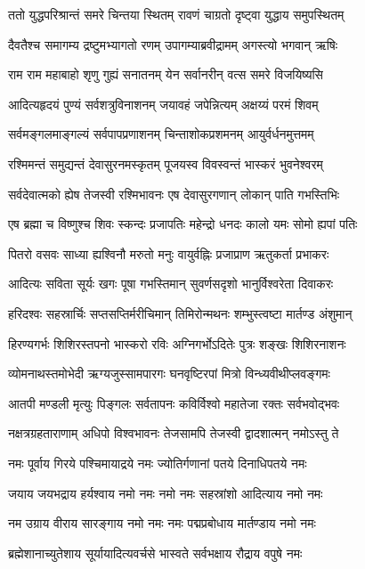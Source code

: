 
\twolineshloka
{ततो युद्धपरिश्रान्तं समरे चिन्तया स्थितम्}
{रावणं चाग्रतो दृष्ट्वा युद्धाय समुपस्थितम्}

\twolineshloka
{दैवतैश्च समागम्य द्रष्टुमभ्यागतो रणम्}
{उपागम्याब्रवीद्रामम् अगस्त्यो भगवान् ऋषिः}

\twolineshloka
{राम राम महाबाहो शृणु गुह्यं सनातनम्}
{येन सर्वानरीन् वत्स समरे विजयिष्यसि}

\twolineshloka
{आदित्यहृदयं पुण्यं सर्वशत्रुविनाशनम्}
{जयावहं जपेन्नित्यम् अक्षय्यं परमं शिवम्}

\twolineshloka
{सर्वमङ्गलमाङ्गल्यं सर्वपापप्रणाशनम्}
{चिन्ताशोकप्रशमनम् आयुर्वर्धनमुत्तमम्}

\twolineshloka
{रश्मिमन्तं समुद्यन्तं देवासुरनमस्कृतम्}
{पूजयस्व विवस्वन्तं भास्करं भुवनेश्वरम्}

\twolineshloka
{सर्वदेवात्मको ह्येष तेजस्वी रश्मिभावनः}
{एष देवासुरगणान् लोकान् पाति गभस्तिभिः}

\twolineshloka
{एष ब्रह्मा च विष्णुश्च शिवः स्कन्दः प्रजापतिः}
{महेन्द्रो धनदः कालो यमः सोमो ह्यपां पतिः}

\twolineshloka
{पितरो वसवः साध्या ह्यश्विनौ मरुतो मनुः}
{वायुर्वह्निः प्रजाप्राण ऋतुकर्ता प्रभाकरः}

\twolineshloka
{आदित्यः सविता सूर्यः खगः पूषा गभस्तिमान्}
{सुवर्णसदृशो भानुर्विश्वरेता दिवाकरः}

\twolineshloka
{हरिदश्वः सहस्रार्चिः सप्तसप्तिर्मरीचिमान्}
{तिमिरोन्मथनः शम्भुस्त्वष्टा मार्तण्ड अंशुमान्}

\twolineshloka
{हिरण्यगर्भः शिशिरस्तपनो भास्करो रविः}
{अग्निगर्भोऽदितेः पुत्रः शङ्खः शिशिरनाशनः}

\twolineshloka
{व्योमनाथस्तमोभेदी ऋग्यजुस्सामपारगः}
{घनवृष्टिरपां मित्रो विन्ध्यवीथीप्लवङ्गमः}

\twolineshloka
{आतपी मण्डली मृत्युः पिङ्गलः सर्वतापनः}
{कविर्विश्वो महातेजा रक्तः सर्वभवोद्भवः}

\twolineshloka
{नक्षत्रग्रहताराणाम् अधिपो विश्वभावनः}
{तेजसामपि तेजस्वी द्वादशात्मन् नमोऽस्तु ते}

\twolineshloka
{नमः पूर्वाय गिरये पश्चिमायाद्रये नमः}
{ज्योतिर्गणानां पतये दिनाधिपतये नमः}

\twolineshloka
{जयाय जयभद्राय हर्यश्वाय नमो नमः}
{नमो नमः सहस्रांशो आदित्याय नमो नमः}

\twolineshloka
{नम उग्राय वीराय सारङ्गाय नमो नमः}
{नमः पद्मप्रबोधाय मार्तण्डाय नमो नमः}

\twolineshloka
{ब्रह्मेशानाच्युतेशाय सूर्यायादित्यवर्चसे}
{भास्वते सर्वभक्षाय रौद्राय वपुषे नमः}

